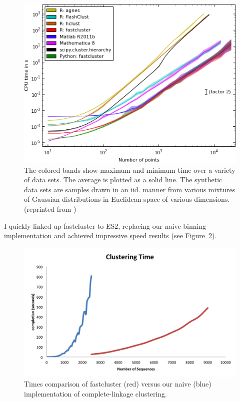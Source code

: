 \begin{figure}[h!]
\centering
\includegraphics[scale=0.75]{images/FastComplete-CH3}
\caption[Complete linkage clustering speed comparison between popular implementations.]{The colored bands show maximum and minimum time over a variety of data sets. The average is plotted as a solid line. The synthetic data sets are samples drawn in an iid. manner from various mixtures of Gaussian distributions in Euclidean space of various dimensions.
(reprinted from \protect\cite{FastClust})}
\label{fig:FastClustComparison}
\end{figure}

I quickly linked up fastcluster to ES2, replacing our naive binning implementation and achieved impressive speed results (see Figure~\ref{fig:FastVsNaive}).

\begin{figure}[h!]
\centering
\includegraphics[scale=.8]{images/FastVsNaive-CH3}
\caption[Time comparison of fastcluster versus our naive implementation of complete-linkage clustering.]{Times comparison of fastcluster (red) versus our naive (blue) implementation of complete-linkage clustering.}
\label{fig:FastVsNaive}
\end{figure}

